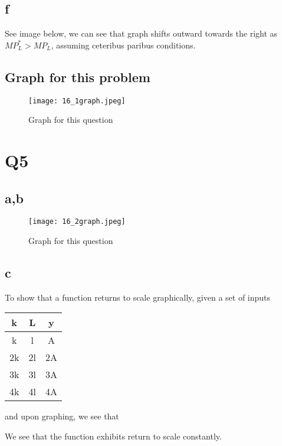 \documentclass[12pt]{article}
\begin{document}
\subsection*{f}
See image below, we can see that graph shifts outward towards the right as $MP^*_L > MP_L$, assuming ceteribus paribus conditions. 
\subsection*{Graph for this problem}
\begin{figure}[H]
    \centering
    \texttt{[image: 16\_1graph.jpeg]}
    \caption{Graph for this question}
    \label{fig:enter-label}
\end{figure}
\section*{Q5}
\subsection*{a,b}
\begin{figure}[H]
    \centering
    \texttt{[image: 16\_2graph.jpeg]}
    \caption{Graph for this question}
    \label{fig:enter-label1}
\end{figure}
\subsection*{c}
To show that a function returns to scale graphically, given a set of inputs 
\begin{center}
    \begin{tabular}{c|c|c}
        k & L & y\\
        \hline
        k & l & A\\
        2k & 2l & 2A\\
        3k & 3l & 3A\\
        4k & 4l & 4A
    \end{tabular}
\end{center}
and upon graphing, we see that 
\begin{center}
\end{center}
We see that the function exhibits return to scale constantly. 
\end{document}
